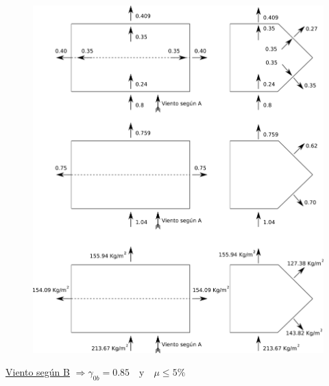 \begin{enumerate}
\newpage
\begin{figure}[H]
\begin{center}
     \includegraphics[scale = 0.8]{chapters/chapter_2/images/cerrada_A.png}
\end{center}
\end{figure}
\newpage


\underline{Viento según B} $\Rightarrow \gamma_{0b}=0.85 \quad \text{y} \quad \mu \leq 5\%$\\


\end{enumerate}
